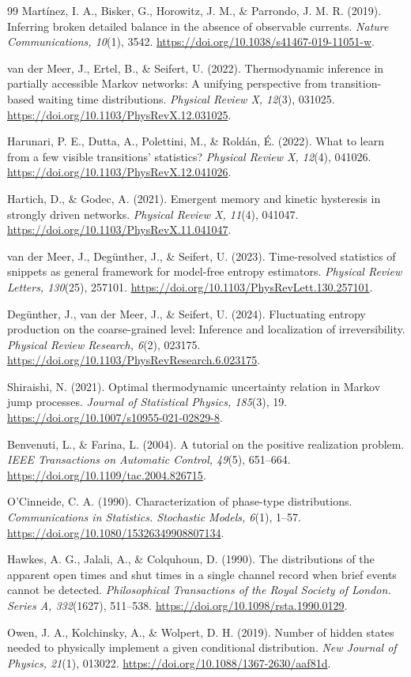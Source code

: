 \documentclass[11pt,a4paper]{article}
\theoremstyle{remark}\newtheorem{remark}[theorem]{Remark}
\begin{document}
\begin{thebibliography}{99}
Mart\'inez, I. A., Bisker, G., Horowitz, J. M., \& Parrondo, J. M. R. (2019).
Inferring broken detailed balance in the absence of observable currents.
\emph{Nature Communications, 10}(1), 3542.
\url{https://doi.org/10.1038/s41467-019-11051-w}.

van der Meer, J., Ertel, B., \& Seifert, U. (2022). Thermodynamic inference
in partially accessible Markov networks: A unifying perspective from
transition-based waiting time distributions. \emph{Physical Review X, 12}(3),
031025. \url{https://doi.org/10.1103/PhysRevX.12.031025}.

Harunari, P. E., Dutta, A., Polettini, M., \& Rold\'an, \'E. (2022). What to
learn from a few visible transitions' statistics? \emph{Physical Review X,
12}(4), 041026. \url{https://doi.org/10.1103/PhysRevX.12.041026}.

Hartich, D., \& Godec, A. (2021). Emergent memory and kinetic hysteresis in
strongly driven networks. \emph{Physical Review X, 11}(4), 041047.
\url{https://doi.org/10.1103/PhysRevX.11.041047}.

van der Meer, J., Degünther, J., \& Seifert, U. (2023). Time-resolved
statistics of snippets as general framework for model-free entropy
estimators. \emph{Physical Review Letters, 130}(25), 257101.
\url{https://doi.org/10.1103/PhysRevLett.130.257101}.

Degünther, J., van der Meer, J., \& Seifert, U. (2024). Fluctuating entropy
production on the coarse-grained level: Inference and localization of
irreversibility. \emph{Physical Review Research, 6}(2), 023175.
\url{https://doi.org/10.1103/PhysRevResearch.6.023175}.

Shiraishi, N. (2021). Optimal thermodynamic uncertainty relation in Markov
jump processes. \emph{Journal of Statistical Physics, 185}(3), 19.
\url{https://doi.org/10.1007/s10955-021-02829-8}.

Benvenuti, L., \& Farina, L. (2004). A tutorial on the positive realization
problem. \emph{IEEE Transactions on Automatic Control, 49}(5), 651--664.
\url{https://doi.org/10.1109/tac.2004.826715}.

O'Cinneide, C. A. (1990). Characterization of phase-type distributions.
\emph{Communications in Statistics. Stochastic Models, 6}(1), 1--57.
\url{https://doi.org/10.1080/15326349908807134}.

Hawkes, A. G., Jalali, A., \& Colquhoun, D. (1990). The distributions of the
apparent open times and shut times in a single channel record when brief
events cannot be detected. \emph{Philosophical Transactions of the Royal
Society of London. Series A, 332}(1627), 511--538.
\url{https://doi.org/10.1098/rsta.1990.0129}.

Owen, J. A., Kolchinsky, A., \& Wolpert, D. H. (2019). Number of hidden states
needed to physically implement a given conditional distribution.
\emph{New Journal of Physics, 21}(1), 013022.
\url{https://doi.org/10.1088/1367-2630/aaf81d}.
\end{thebibliography}
\end{document}
